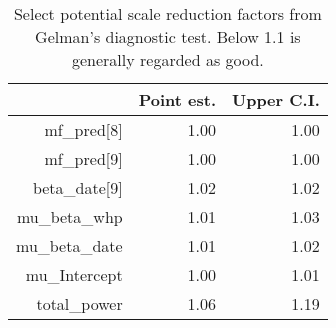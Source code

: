 \begin{table}[]
\centering
\begin{tabular}{rrr}
  \hline
 & Point est. & Upper C.I. \\ 
  \hline
mf\_pred[8] & 1.00 & 1.00 \\ 
  mf\_pred[9] & 1.00 & 1.00 \\ 
  beta\_date[9] & 1.02 & 1.02 \\ 
  mu\_beta\_whp & 1.01 & 1.03 \\ 
  mu\_beta\_date & 1.01 & 1.02 \\ 
  mu\_Intercept & 1.00 & 1.01 \\ 
  total\_power & 1.06 & 1.19 \\ 
   \hline
\end{tabular}
\caption{Select potential scale reduction factors from Gelman's diagnostic test. Below 1.1 is generally regarded as good.} 
\label{tab:gelman}
\end{table}
